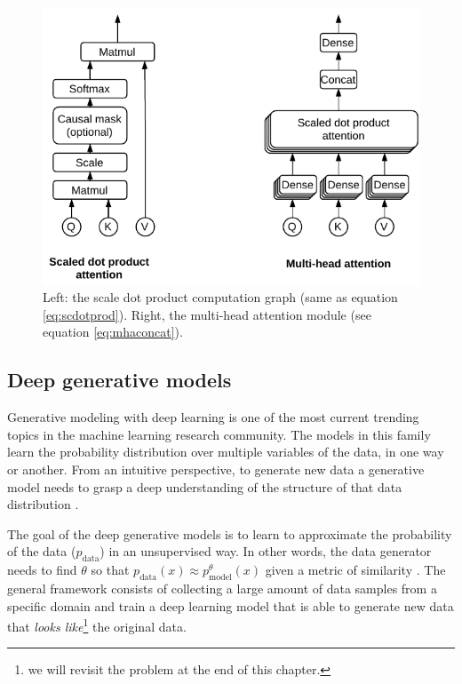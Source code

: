 \begin{figure}
	\centering
	\includegraphics[width=0.85\linewidth]{background/images/attention_modules}
	\caption[Transformer building blocks]{Left: the scale dot product computation graph (same as equation \ref{eq:scdotprod}). Right, the multi-head attention module (see equation \ref{eq:mhaconcat}).}
	\label{fig:attentionmodules}
\end{figure}

\subsection{Deep generative models} \label{sec:generative}
Generative modeling with deep learning is one of the most current trending topics in the machine learning research community. The models in this family learn the probability distribution over multiple variables of the data, in one way or another. From an intuitive perspective, to generate new data a generative model needs to grasp a deep understanding of the structure of that data distribution \autocite{Goodfellow2016}.

The goal of the deep generative models is to learn to approximate the probability of the data ($p_\mathrm{data}$) in an unsupervised way. In other words, the data generator needs to find $\theta$ so that $p_\mathrm{data}(x) \approx p_\mathrm{model}^\theta(x)$ given a metric of similarity \autocite{Goodfellow2016}. The general framework consists of collecting a large amount of data samples from a specific domain and train a deep learning model that is able to generate new data that \textit{looks like}\footnote{we will revisit the problem at the end of this chapter.} the original data.


